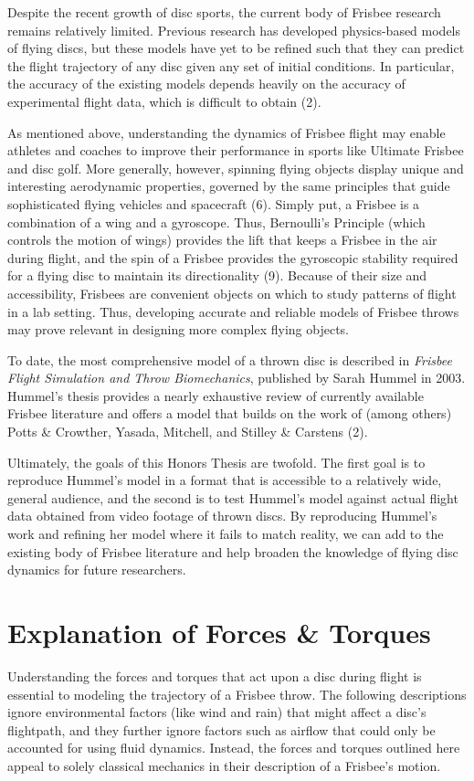 \documentclass[a4paper,12pt, oneside]{article}
\begin{document}
Despite the recent growth of disc sports, the current body of Frisbee research remains relatively limited. Previous research has developed physics-based models of flying discs, but these models have yet to be refined such that they can predict the flight trajectory of any disc given any set of initial conditions. In particular, the accuracy of the existing models depends heavily on the accuracy of experimental flight data, which is difficult to obtain (2).

As mentioned above, understanding the dynamics of Frisbee flight may enable athletes and coaches to improve their performance in sports like Ultimate Frisbee and disc golf.  More generally, however, spinning flying objects display unique and interesting aerodynamic properties, governed by the same principles that guide sophisticated flying vehicles and spacecraft (6). Simply put, a Frisbee is a combination of a wing and a gyroscope. Thus, Bernoulli's Principle (which controls the motion of wings) provides the lift that keeps a Frisbee in the air during flight, and the spin of a Frisbee provides the gyroscopic stability required for a flying disc to maintain its directionality (9). Because of their size and accessibility, Frisbees are convenient objects on which to study patterns of flight in a lab setting. Thus, developing accurate and reliable models of Frisbee throws may prove relevant in designing more complex flying objects. 
 
To date, the most comprehensive model of a thrown disc is described in \textit{Frisbee Flight Simulation and Throw Biomechanics}, published by Sarah Hummel in 2003. Hummel's thesis provides a nearly exhaustive review of currently available Frisbee literature and offers a model that builds on the work of (among others) Potts \& Crowther, Yasada, Mitchell, and Stilley \& Carstens (2). 

Ultimately, the goals of this Honors Thesis are twofold. The first goal is to reproduce Hummel's model in a format that is accessible to a relatively wide, general audience, and the second is to test Hummel's model against actual flight data obtained from video footage of thrown discs. By reproducing Hummel's work and refining her model where it fails to match reality, we can add to the existing body of Frisbee literature and help broaden the knowledge of flying disc dynamics for future researchers.

\section{Explanation of Forces \& Torques}
Understanding the forces and torques that act upon a disc during flight is essential to modeling the trajectory of a Frisbee throw. The following descriptions ignore environmental factors (like wind and rain) that might affect a disc's flightpath, and they further ignore factors such as airflow that could only be accounted for using fluid dynamics. Instead, the forces and torques outlined here appeal to solely classical mechanics in their description of a Frisbee's motion.
\end{document}
